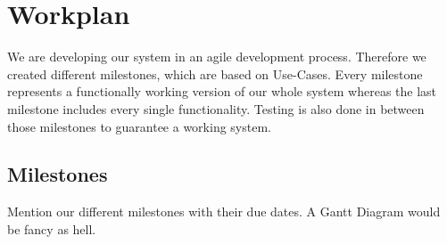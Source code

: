 \chapter{Workplan}
We are developing our system in an agile development process. Therefore we created different milestones, which are based on Use-Cases. Every milestone represents a functionally working version of our whole system whereas the last milestone includes every single functionality. Testing is also done in between those milestones to guarantee a working system. 

\section{Milestones}
Mention our different milestones with their due dates. A Gantt Diagram would be fancy as hell.
